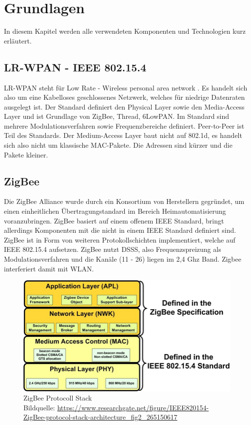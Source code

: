 \chapter{Grundlagen}

In diesem Kapitel werden alle verwendeten Komponenten und Technologien kurz erläutert.

\section{LR-WPAN - IEEE 802.15.4}

LR-WPAN steht für \grqq Low Rate - Wireless personal area network \grqq{}. Es handelt sich also um eine Kabelloses geschlossenes Netzwerk, welches für 
niedrige Datenraten ausgelegt ist. Der Standard definiert den Physical Layer sowie den Media-Access Layer und ist Grundlage von ZigBee, Thread, 6LowPAN.
Im Standard sind mehrere Modulationsverfahren sowie Frequenzbereiche definiert. Peer-to-Peer ist Teil des Standards. Der Medium-Access Layer baut nicht
auf 802.1d, es handelt sich also nicht um klassische MAC-Pakete. Die Adressen sind kürzer und die Pakete kleiner. 

\section{ZigBee}

Die ZigBee Alliance wurde durch ein Konsortium von Herstellern gegründet, um einen einheitlichen Übertragungstandard
im Bereich Heimautomatisierung voranzubringen. ZigBee basiert auf einem offenem IEEE Standard, bringt allerdings Komponenten mit die nicht in einem IEEE
Standard definiert sind.
ZigBee ist in Form von weiteren Protokollschichten implementiert, welche auf IEEE 802.15.4 aufsetzen. ZigBee nutzt DSSS, also Frequenzspreizung als Modulationsverfahren
und die Kanäle (11 - 26) liegen im 2,4 Ghz Band. Zigbee interferiert damit mit WLAN.

\begin{figure}[H]
  \centering
  \includegraphics[width=1\textwidth]{media/Zigbee Stack.jpg}
  \caption{ZigBee Protocoll Stack \\ Bildquelle: \url{https://www.researchgate.net/figure/IEEE820154-ZigBee-protocol-stack-architecture_fig2_265150617}}
\end{figure}


